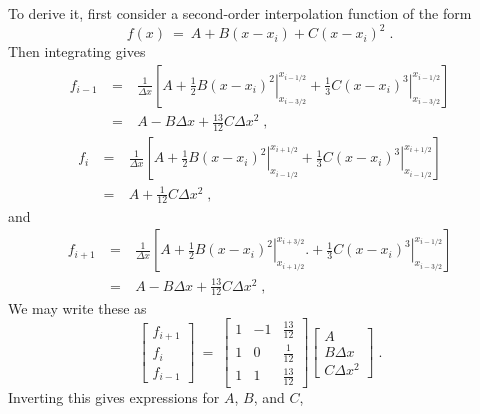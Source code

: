 To derive it, first consider a
second-order interpolation function of the form
\begin{equation}
f\left(x\right) \: = \: A + B \left(x - x_i\right) + C \left(x - x_i\right)^2 \; .
\end{equation}
Then integrating gives
\begin{eqnarray}
f_{i-1} \: & = & \: \frac{1}{\Delta x}\left[ A + \left. \frac{1}{2}
B \left(x - x_i\right)^2 \right|^{x_{i-1/2}}_{x_{i-3/2}} + \left. \frac{1}{3}
C \left(x - x_i\right)^3 \right|^{x_{i-1/2}}_{x_{i-3/2}} \right]\nonumber  \\
           & = & \: A - B\Delta x + \frac{13}{12} C \Delta x^2 \;,
\end{eqnarray}
\begin{eqnarray}
f_{i} \: & = & \: \frac{1}{\Delta x}\left[ A + \left. \frac{1}{2} B \left(x - x_i\right)^2 \right|^{x_{i+1/2}}_{x_{i-1/2}}
+ \left. \frac{1}{3}  C \left(x - x_i\right)^3 \right|^{x_{i+1/2}}_{x_{i-1/2}}  \right]\nonumber \\
           & = & \: A + \frac{1}{12} C \Delta x^2 \; ,
\end{eqnarray}
and
\begin{eqnarray}
f_{i+1} \: & = & \: \frac{1}{\Delta x}\left[ A + \left.\frac{1}{2} B \left(x - x_i\right)^2 \right|^{x_{i+3/2}}_{x_{i+1/2}}.
+ \left. \frac{1}{3}  C \left(x - x_i\right)^3 \right|^{x_{i-1/2}}_{x_{i-3/2}} \right]\nonumber  \\
           & = & \: A - B\Delta x + \frac{13}{12} C \Delta x^2 \;,
\end{eqnarray}
We may write these as
\begin{equation}
\left[ \begin{array}{c}
f_{i+1} \\ f_{i} \\ f_{i-1}
\end{array} \right] \: = \:
\left[ \begin{array}{ccc}
1 & -1 & \frac{13}{12} \\ 1 & 0 & \frac{1}{12} \\ 1 & 1 & \frac{13}{12}
\end{array} \right]
\left[ \begin{array}{ccc}
A \\ B\Delta x \\ C \Delta x^2
\end{array} \right] \; .
\end{equation}
Inverting this gives expressions for $A$, $B$, and $C$,
